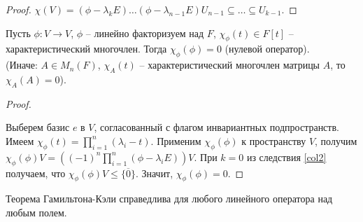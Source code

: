 \begin{proof}
    $\chi(V) = (\phi - \lambda_k E) \dots (\phi - \lambda_{n - 1} E) U_{n - 1} \subseteq \dots \subseteq U_{k - 1}$.
\end{proof}

\begin{theorem}
    \label{th4.4}
    Пусть $\phi: V \to V$, $\phi$ -- линейно факторизуем над $F$, $\chi_{\phi}(t) \in F[t]$ -- характеристический многочлен. Тогда $\chi_{\phi}(\phi) = 0$ (нулевой оператор).\\
    (Иначе: $A \in M_n(F)$, $\chi_A(t)$ -- характеристический многочлен матрицы $A$, то $\chi_A(A) = 0$).
\end{theorem}

\begin{proof}~

    Выберем базис $e$ в $V$, согласованный с флагом инвариантных подпространств. Имеем $\chi_{\phi}(t) = \prod_{i=1}^n (\lambda_i - t)$. Применим $\chi_{\phi}(\phi)$ к пространству $V$, получим $\chi_{\phi}(\phi)V = \left((-1)^n \prod_{i=1}^n (\phi - \lambda_i E)\right)V$. При $k = 0$ из следствия \ref{col2} получаем, что $\chi_{\phi}(\phi)V \leq \{\overline{0}\}$. Значит, $\chi_{\phi}(\phi) = 0$.
\end{proof}

\begin{note}
    Теорема Гамильтона-Кэли справедлива для любого линейного оператора над любым полем.
\end{note}